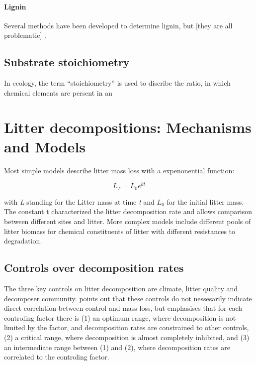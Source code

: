 \paragraph{Lignin}
Several methods have been developed to determine lignin, but [they are all problematic] \citep{Hatfield2005}.



\subsection{Substrate stoichiometry}

In ecology, the term ``stoichiometry'' is used to discribe the ratio, in which chemical elements are persent in an 




\section{Litter decompositions: Mechanisms and Models}
 Most simple models describe litter mass loss with a expenonential function:

\begin{equation}
L_T=L_0e^{kt}
\end{equation}

with \emph{L} standing for the Litter mass at time \emph{t} and $L_0$ for the initial litter mass. The constant t characterized the litter decomposition rate \citep[p.157]{Chapin2002} and allows comparison between different sites and litter. More complex models include different pools of litter biomass for chemical constituents of litter with different resistances to degradation. 

\subsection{Controls over decomposition rates}
\label{decomp_controls}

The three key controls on litter decomposition are climate, litter quality and decomposer community. \cite{Prescott2010} points out that these controls do not nessesarily indicate direct correlation between control and mass loss, but emphasises that for each controling factor there is (1) an optimum range, where decomposition is not limited by the factor, and decomposition rates are constrained to other controls, (2) a critical range, where decomposition is almost completely inhibited, and (3) an intermediate range between (1) and (2), where decomposition rates are correlated to the controling factor. 

